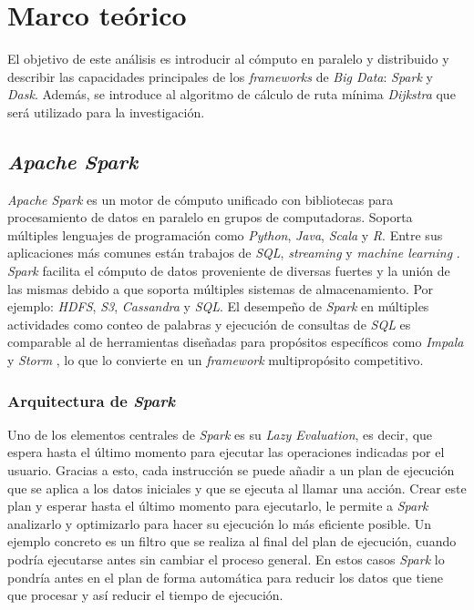 \chapter{Marco teórico}

\noindent El objetivo de este análisis es introducir al cómputo en paralelo y distribuido y describir las capacidades principales de los \textit{frameworks}  de \textit{Big Data}: \textit{Spark} y \textit{Dask}. Además, se introduce al algoritmo de cálculo de ruta mínima \textit{Dijkstra} que será utilizado para la investigación.

\section{\textit{Apache Spark}}

\textit{Apache Spark} es un motor de cómputo unificado con bibliotecas para procesamiento de datos en paralelo en grupos de computadoras. Soporta múltiples lenguajes de programación como \textit{Python}, \textit{Java}, \textit{Scala} y \textit{R}. Entre sus aplicaciones más comunes están trabajos de \textit{SQL}, \textit{streaming} y \textit{machine learning} \cite{sparkguide}. \textit{Spark} facilita el cómputo de datos proveniente de diversas fuertes y la unión de las mismas debido a que soporta múltiples sistemas de almacenamiento. Por ejemplo: \textit{HDFS}, \textit{S3}, \textit{Cassandra} y \textit{SQL}. El desempeño de \textit{Spark} en múltiples actividades como conteo de palabras y ejecución de consultas de \textit{SQL} es comparable al de herramientas diseñadas para propósitos específicos como \textit{Impala} y \textit{Storm} \cite{sparkberkeley}, lo que lo convierte en un \textit{framework} multipropósito competitivo.

\subsection{Arquitectura de \textit{Spark}}

Uno de los elementos centrales de \textit{Spark} es su \textit{Lazy Evaluation}, es decir, que espera hasta el último momento para ejecutar las operaciones indicadas por el usuario. Gracias a esto, cada instrucción se puede añadir a un plan de ejecución que se aplica a los datos iniciales y que se ejecuta al llamar una acción. Crear este plan y esperar hasta el último momento para ejecutarlo, le permite a \textit{Spark} analizarlo y optimizarlo para hacer su ejecución lo más eficiente posible. Un ejemplo concreto es un filtro que se realiza al final del plan de ejecución, cuando podría ejecutarse antes sin cambiar el proceso general. En estos casos \textit{Spark} lo pondría antes en el plan de forma automática para reducir los datos que tiene que procesar y así reducir el tiempo de ejecución.

